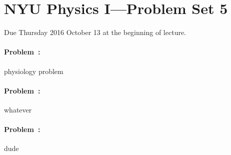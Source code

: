 \documentclass[12pt]{article}
\begin{document}
\section*{NYU Physics I---Problem Set 5}

Due Thursday 2016 October 13 at the beginning of lecture.

\paragraph{Problem~\theproblem:}%
physiology problem

\paragraph{Problem~\theproblem:}%
whatever

\paragraph{Problem~\theproblem:}%
dude
\end{document}
